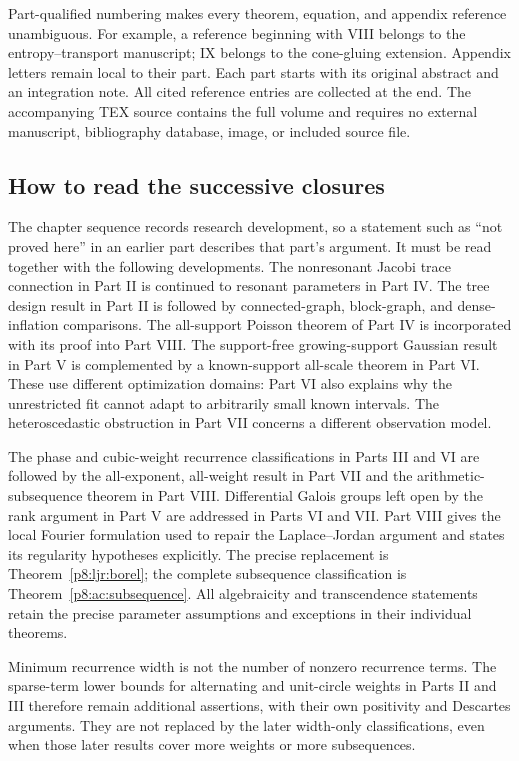 \documentclass[11pt,a4paper]{article}
\theoremstyle{definition}
\theoremstyle{remark}
\numberwithin{equation}{section}
\begin{document}
Part-qualified numbering makes every theorem, equation, and appendix
reference unambiguous. For example, a reference beginning with VIII belongs
to the entropy--transport manuscript; IX belongs to the cone-gluing extension. Appendix letters remain local to their part.
Each part starts with its original abstract and an integration note.
All cited reference entries are collected at the end. The accompanying
TEX source contains the full volume and requires no external manuscript,
bibliography database, image, or included source file.

\subsection*{How to read the successive closures}

The chapter sequence records research development, so a statement such as
``not proved here'' in an earlier part describes that part's argument.
It must be read together with the following developments. The nonresonant
Jacobi trace connection in Part II is continued to resonant parameters in
Part IV. The tree design result in Part II is followed by connected-graph,
block-graph, and dense-inflation comparisons. The all-support Poisson
theorem of Part IV is incorporated with its proof into Part VIII.
The support-free growing-support Gaussian result in Part V is complemented
by a known-support all-scale theorem in Part VI. These use different
optimization domains: Part VI also explains why the unrestricted fit
cannot adapt to arbitrarily small known intervals. The heteroscedastic
obstruction in Part VII concerns a different observation model.

The phase and cubic-weight recurrence classifications in Parts III and VI
are followed by the all-exponent, all-weight result in Part VII and the
arithmetic-subsequence theorem in Part VIII. Differential Galois groups
left open by the rank argument in Part V are addressed in Parts VI and VII.
Part VIII gives the local Fourier formulation used to repair the
Laplace--Jordan argument and states its regularity hypotheses explicitly.
The precise replacement is Theorem~\ref{p8:ljr:borel}; the complete
subsequence classification is Theorem~\ref{p8:ac:subsequence}.
All algebraicity and transcendence statements retain the precise
parameter assumptions and exceptions in their individual theorems.

Minimum recurrence width is not the number of nonzero recurrence terms.
The sparse-term lower bounds for alternating and unit-circle weights in
Parts II and III therefore remain additional assertions, with their own
positivity and Descartes arguments. They are not replaced by the later
width-only classifications, even when those later results cover more
weights or more subsequences.
\end{document}
